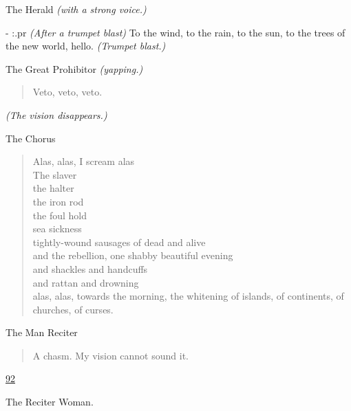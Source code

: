\documentclass[letterpaper,article,12pt,oneside,notitlepage]{memoir}
\begin{document}
\begin{center}The Herald \textit{(with a strong voice.)}\end{center}

- {:.pr} \textit{(After a trumpet blast)} To the wind, to the rain, to the sun, to the trees of the new world, hello. \textit{(Trumpet blast.)}

\begin{center}The Great Prohibitor \textit{(yapping.)}\end{center}

\begin{verse}
Veto, veto, veto.  \\
\end{verse}

\textit{(The vision disappears.)}

\begin{center}The Chorus\end{center}

\begin{verse}
Alas, alas, I scream alas \\
The slaver \\
the halter \\
the iron rod \\
the foul hold \\
sea sickness \\
tightly-wound sausages of dead and alive \\
and the rebellion, one shabby beautiful evening \\
and shackles and handcuffs \\
and rattan and drowning \\
alas, alas, towards the morning, the whitening of islands, of continents, of churches, of curses. \\
\end{verse}

\begin{center}The Man Reciter\end{center}

\begin{verse}
A chasm. My vision cannot sound it. \\
\end{verse}


\clearpage

\href{http://cesaire.elotroalex.com/chiens/chiens/p092.html}{92}

\begin{center}The Reciter Woman.\end{center}
\end{document}
